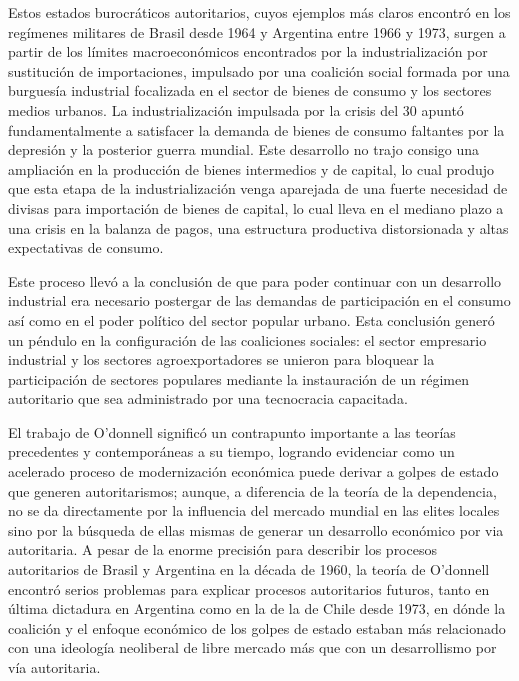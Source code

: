 \documentclass{article}
\begin{document}
Estos estados burocráticos autoritarios, cuyos ejemplos más claros encontró en los
regímenes militares de Brasil desde 1964 y Argentina entre 1966 y 1973, surgen a partir
de los límites macroeconómicos encontrados por la industrialización por sustitución de
importaciones, impulsado por una coalición social formada por una burguesía industrial
focalizada en el sector de bienes de consumo y los sectores medios urbanos. La 
industrialización impulsada por la crisis del 30 apuntó fundamentalmente a satisfacer
la demanda de bienes de consumo faltantes por la depresión y la posterior guerra mundial.
Este desarrollo no trajo consigo una ampliación en la producción de bienes intermedios y de
capital, lo cual produjo que esta etapa de la industrialización venga aparejada de una 
fuerte necesidad de divisas para importación de bienes de capital, lo cual lleva en el
mediano plazo a una crisis en la balanza de pagos, una estructura productiva distorsionada
y altas expectativas de consumo.

Este proceso llevó a la conclusión de que para poder continuar con un desarrollo 
industrial era necesario postergar de las demandas de participación en el consumo
así como en el poder político del sector popular urbano. Esta conclusión generó un péndulo
en la configuración de las coaliciones sociales: el sector empresario industrial y los
sectores agroexportadores se unieron para bloquear la participación de sectores populares
mediante la instauración de un régimen autoritario que sea administrado por una tecnocracia
capacitada.

El trabajo de O'donnell significó un contrapunto importante a las teorías precedentes y
contemporáneas a su tiempo, logrando evidenciar como un acelerado proceso de modernización
económica puede derivar a golpes de estado que generen autoritarismos; aunque, a diferencia
de la teoría de la dependencia, no se da directamente por la influencia del mercado mundial
en las elites locales sino por la búsqueda de ellas mismas de generar un desarrollo económico por via
autoritaria. A pesar de la enorme precisión para describir los procesos autoritarios de 
Brasil y Argentina en la década de 1960, la teoría de O'donnell encontró serios problemas
para explicar procesos autoritarios futuros, tanto en última dictadura en Argentina como en la de
la de Chile desde 1973, en dónde la coalición y el enfoque económico de los golpes de estado
estaban más relacionado con una ideología neoliberal de libre mercado más que con un 
desarrollismo por vía autoritaria.
\end{document}
